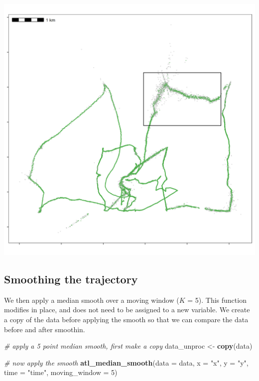 \documentclass[]{scrartcl}
\newenvironment{Shaded}{}{}
\newcommand{\CommentTok}[1]{\textcolor[rgb]{0.38,0.63,0.69}{\textit{#1}}}
\newcommand{\DataTypeTok}[1]{\textcolor[rgb]{0.56,0.13,0.00}{#1}}
\newcommand{\DecValTok}[1]{\textcolor[rgb]{0.25,0.63,0.44}{#1}}
\newcommand{\KeywordTok}[1]{\textcolor[rgb]{0.00,0.44,0.13}{\textbf{#1}}}
\newcommand{\NormalTok}[1]{#1}
\newcommand{\StringTok}[1]{\textcolor[rgb]{0.25,0.44,0.63}{#1}}
\begin{document}
\includegraphics{figures/fig_speed_outlier.png}

\hypertarget{smoothing-the-trajectory}{%
\subsection{Smoothing the trajectory}\label{smoothing-the-trajectory}}

We then apply a median smooth over a moving window (\(K\) = 5).
This function modifies in place, and does not need to be assigned to a new variable.
We create a copy of the data before applying the smooth so that we can compare the data before and after smoothin.

\begin{Shaded}
\begin{Highlighting}[]
\CommentTok{# apply a 5 point median smooth, first make a copy}
\NormalTok{data_unproc <-}\StringTok{ }\KeywordTok{copy}\NormalTok{(data)}

\CommentTok{# now apply the smooth}
\KeywordTok{atl_median_smooth}\NormalTok{(}\DataTypeTok{data =}\NormalTok{ data,}
                  \DataTypeTok{x =} \StringTok{"x"}\NormalTok{, }\DataTypeTok{y =} \StringTok{"y"}\NormalTok{, }\DataTypeTok{time =} \StringTok{"time"}\NormalTok{,}
                  \DataTypeTok{moving_window =} \DecValTok{5}\NormalTok{)}
\end{Highlighting}
\end{Shaded}
\end{document}
